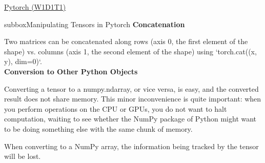 \begin{multicols}{3}
\begin{textbox}{\href{https://deeplearning.neuromatch.io/tutorials/W1D1_BasicsAndPytorch/student/W1D1_Tutorial1.html}{Pytorch (W1D1T1) }}
\begin{subbox}{subbox}{Manipulating Tensors in Pytorch}
\textbf{Concatenation}

Two matrices can be concatenated along rows (axis 0, the first element of the shape) vs. columns (axis 1, the second element of the shape) using  `torch.cat((x, y), dim=0)`.\\


\textbf{Conversion to Other Python Objects}

Converting a tensor to a numpy.ndarray, or vice versa, is easy, and the converted result does not share memory. This minor inconvenience is quite important: when you perform operations on the CPU or GPUs, you do not want to halt computation, waiting to see whether the NumPy package of Python might want to be doing something else with the same chunk of memory.

When converting to a NumPy array, the information being tracked by the tensor will be lost.

\end{subbox}
\end{textbox}

\end{multicols}